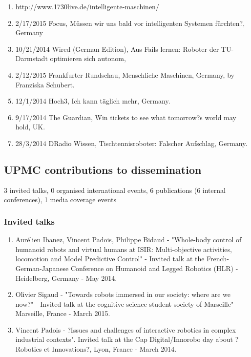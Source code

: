 \begin{enumerate}
\item http://www.1730live.de/intelligente-maschinen/
\item 2/17/2015 Focus, Müssen wir uns bald vor intelligenten Systemen fürchten?, Germany
\item 10/21/2014 Wired (German Edition), Aus Fails lernen: Roboter der TU-Darmstadt optimieren sich autonom,
\item 2/12/2015 Frankfurter Rundschau, Menschliche Maschinen, Germany, by Franziska Schubert. 
\item 12/1/2014 Hoch3, Ich kann täglich mehr, Germany.
\item 9/17/2014 The Guardian, Win tickets to see what tomorrow?s world may hold, UK.
\item 28/3/2014 DRadio Wissen, Tischtennisroboter: Falscher Aufschlag, Germany.
\end{enumerate}

\subsection{UPMC contributions to dissemination}

3 invited talks, 0 organised international events, 6 publications (6 internal conferences), 1 media coverage events

\subsubsection{Invited talks}

\begin{enumerate}
\item Aurélien Ibanez, Vincent Padois, Philippe Bidaud - "Whole-body control of humanoid robots and virtual humans at ISIR: Multi-objective activities, locomotion and Model Predictive Control" - Invited talk at the French-German-Japanese Conference on Humanoid and Legged Robotics (HLR) - Heidelberg,  Germany - May 2014.

\item Olivier Sigaud - "Towards robots immersed in our society: where are we now?" - Invited talk at  the cognitive science student society of Marseille" -  Marseille, France - March 2015.

\item Vincent Padois - ?Issues and challenges of interactive robotics in complex industrial contexts". Invited talk at the Cap Digital/Innorobo day about ?Robotics et Innovations?, Lyon, France - March 2014.
\end{enumerate}

